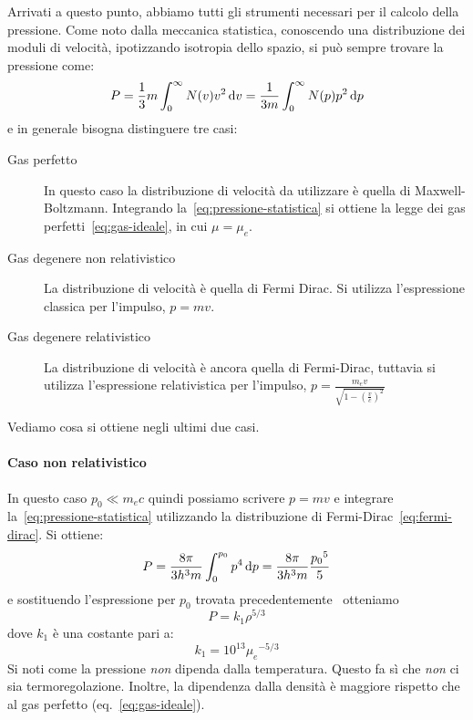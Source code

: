 Arrivati a questo punto, abbiamo tutti gli strumenti necessari per il calcolo della pressione. Come noto dalla meccanica statistica, conoscendo una distribuzione dei moduli di velocità, ipotizzando isotropia dello spazio, si può sempre trovare la pressione come:
\begin{equation}\label{eq:pressione-statistica}
    P = \frac{1}{3} m \int_0^\infty N(v) v^2 \mathop{\mathrm{{}d}}\mathopen{} v = \frac{1}{3m} \int_0^\infty N(p) p^2 \mathop{\mathrm{{}d}}\mathopen{} p
\end{equation}
e in generale bisogna distinguere tre casi:
\begin{description}
    \item[Gas perfetto] In questo caso la distribuzione di velocità da utilizzare è quella di Maxwell-Boltzmann. Integrando la~\eqref{eq:pressione-statistica} si ottiene la legge dei gas perfetti~\eqref{eq:gas-ideale}, in cui $\mu = \mu_e$.
    \item[Gas degenere non relativistico] La distribuzione di velocità è quella di Fermi Dirac. Si utilizza l'espressione classica per l'impulso, $p=mv$.
    \item[Gas degenere relativistico] La distribuzione di velocità è ancora quella di Fermi-Dirac, tuttavia si utilizza l'espressione relativistica per l'impulso, $p= \frac{m_e v}{\sqrt{1- (\frac{v}{c})^2}}$
\end{description}
Vediamo cosa si ottiene negli ultimi due casi.

\paragraph{Caso non relativistico}
In questo caso $p_0 \ll m_e c$ quindi possiamo scrivere $p=mv$ e integrare la~\eqref{eq:pressione-statistica} utilizzando la distribuzione di Fermi-Dirac~\eqref{eq:fermi-dirac}. Si ottiene:
\[
P = \dfrac{8\pi}{3h^3m} \int_0^{p_0} p^4 \mathop{\mathrm{{}d}}\mathopen{} p = \dfrac{8\pi}{3h^3m}\dfrac{{p_0}^5}{5}
\]
e sostituendo l'espressione per $p_0$ trovata precedentemente~ otteniamo
\begin{equation}\label{eq:pressione-degenerazione-non-relativistica}
    P = k_1 \rho^{5/3}
\end{equation}
dove $k_1$ è una costante pari a:
\[
k_1 = 10^{13} {\mu_e}^{-5/3}
\]
Si noti come la pressione \emph{non} dipenda dalla temperatura. Questo fa sì che \emph{non} ci sia termoregolazione. Inoltre, la dipendenza dalla densità è maggiore rispetto che al gas perfetto (eq.~\eqref{eq:gas-ideale}).

